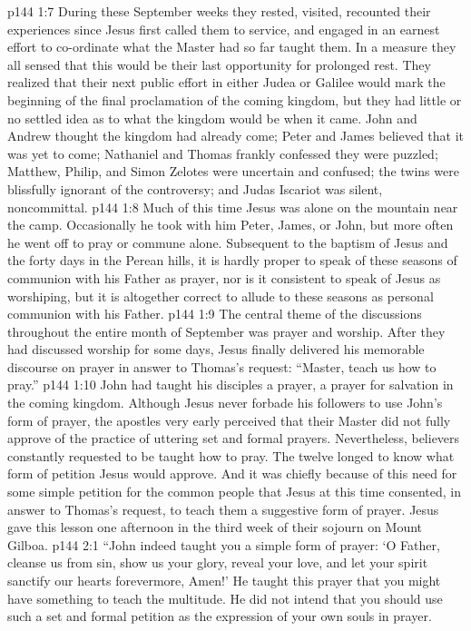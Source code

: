 \vs p144 1:7 During these September weeks they rested, visited, recounted their experiences since Jesus first called them to service, and engaged in an earnest effort to co\hyp{}ordinate what the Master had so far taught them. In a measure they all sensed that this would be their last opportunity for prolonged rest. They realized that their next public effort in either Judea or Galilee would mark the beginning of the final proclamation of the coming kingdom, but they had little or no settled idea as to what the kingdom would be when it came. John and Andrew thought the kingdom had already come; Peter and James believed that it was yet to come; Nathaniel and Thomas frankly confessed they were puzzled; Matthew, Philip, and Simon Zelotes were uncertain and confused; the twins were blissfully ignorant of the controversy; and Judas Iscariot was silent, noncommittal.
\pc \vs p144 1:8 Much of this time Jesus was alone on the mountain near the camp. Occasionally he took with him Peter, James, or John, but more often he went off to pray or commune alone. Subsequent to the baptism of Jesus and the forty days in the Perean hills, it is hardly proper to speak of these seasons of communion with his Father as prayer, nor is it consistent to speak of Jesus as worshiping, but it is altogether correct to allude to these seasons as personal communion with his Father.
\vs p144 1:9 The central theme of the discussions throughout the entire month of September was prayer and worship. After they had discussed worship for some days, Jesus finally delivered his memorable discourse on prayer in answer to Thomas’s request: “Master, teach us how to pray.”
\vs p144 1:10 John had taught his disciples a prayer, a prayer for salvation in the coming kingdom. Although Jesus never forbade his followers to use John’s form of prayer, the apostles very early perceived that their Master did not fully approve of the practice of uttering set and formal prayers. Nevertheless, believers constantly requested to be taught how to pray. The twelve longed to know what form of petition Jesus would approve. And it was chiefly because of this need for some simple petition for the common people that Jesus at this time consented, in answer to Thomas’s request, to teach them a suggestive form of prayer. Jesus gave this lesson one afternoon in the third week of their sojourn on Mount Gilboa.
\vs p144 2:1 \textcolor{ubdarkred}{“John indeed taught you a simple form of prayer: ‘O Father, cleanse us from sin, show us your glory, reveal your love, and let your spirit sanctify our hearts forevermore, Amen!’ He taught this prayer that you might have something to teach the multitude. He did not intend that you should use such a set and formal petition as the expression of your own souls in prayer.}
